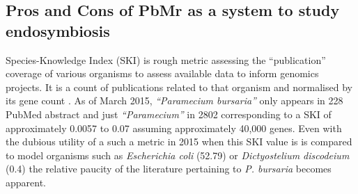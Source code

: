 %
%



\subsection{Pros and Cons of PbMr as a system to study endosymbiosis}
Species-Knowledge Index (SKI) is rough metric assessing the ``publication''
coverage of various organisms to assess available data to inform genomics projects.
It is a count of publications related to that organism and normalised by its gene
count \citep{Janssen2005}. As of March 2015, \textit{``Paramecium bursaria''} only appears
in 228 PubMed abstract and just \textit{``Paramecium''} in 2802 corresponding to a
SKI of approximately 0.0057 to 0.07 assuming approximately 40,000 genes.  Even with the
dubious utility of a such a metric in 2015 when this SKI value is 
is compared to model organisms such as \textit{Escherichia coli} (52.79) or 
\textit{Dictyostelium discodeium} (0.4) the relative paucity of the literature
pertaining to \textit{P. bursaria} becomes apparent.



